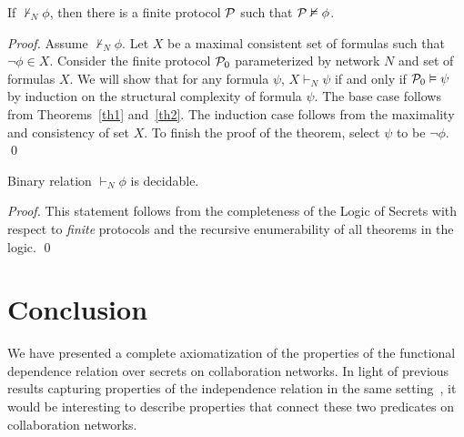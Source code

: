 \documentclass{llncs}
\newcommand{\pp}{{\cal P}}
\begin{document}
\begin{theorem}\label{}
If $\nvdash_N \phi$, then there is a finite protocol ${\cal P}$ such that ${\cal P}\nvDash \phi$. 
\end{theorem}
\begin{proof}
Assume $\nvdash_N \phi$. Let $X$ be a maximal consistent set of formulas such that $\neg\phi\in X$. Consider the finite  protocol $\pp_0$ parameterized by network $N$ and set of formulas $X$. 
We will show that for any formula $\psi$, $X\vdash_N \psi$ if and only if $\pp_0 \vDash \psi$ by induction on the structural complexity
of formula $\psi$. The base case follows from Theorems~\ref{th1} and~\ref{th2}. The induction case follows from the maximality and consistency of set $X$. To finish the proof of the theorem, select $\psi$ to be $\neg\phi$.
\qed \end{proof}

\begin{corollary}\label{}
Binary relation $\vdash_N\phi$ is decidable.
\end{corollary}

\begin{proof}
This statement follows from the completeness of the Logic of Secrets with respect to {\em finite} protocols and the recursive enumerability of all theorems in the logic. \qed
\end{proof}

\section{Conclusion}

We have presented a complete axiomatization of the properties of the functional dependence relation over secrets on collaboration networks.  In light of previous results capturing properties of the independence relation in the same setting~\cite{mn09a}, it would be interesting to describe properties that connect these two predicates on collaboration networks.  
\end{document}
